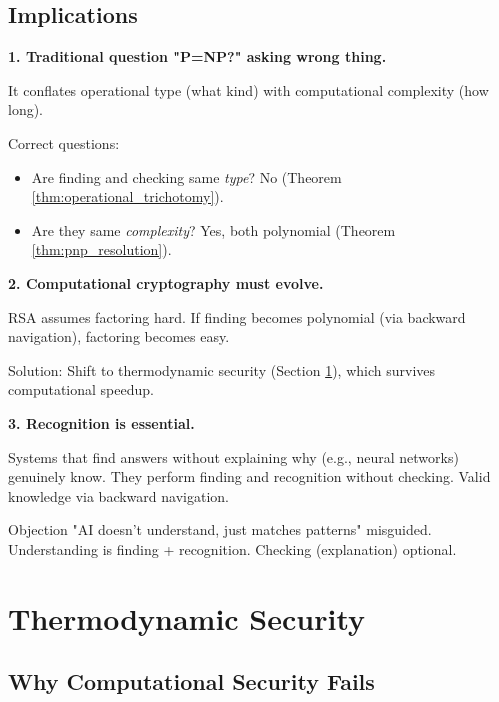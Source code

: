 \documentclass[twocolumn,10pt]{revtex4-2}
\theoremstyle{definition}
\theoremstyle{remark}
\begin{document}
\subsection{Implications}

\textbf{1. Traditional question "P=NP?" asking wrong thing.}

It conflates operational type (what kind) with computational complexity (how long).

Correct questions:
\begin{itemize}
\item Are finding and checking same \textit{type}? No (Theorem \ref{thm:operational_trichotomy}).
\item Are they same \textit{complexity}? Yes, both polynomial (Theorem \ref{thm:pnp_resolution}).
\end{itemize}

\vspace{0.2cm}
\noindent\textbf{2. Computational cryptography must evolve.}

RSA assumes factoring hard. If finding becomes polynomial (via backward navigation), factoring becomes easy.

Solution: Shift to thermodynamic security (Section \ref{sec:thermodynamic_security}), which survives computational speedup.

\vspace{0.2cm}
\noindent\textbf{3. Recognition is essential.}

Systems that find answers without explaining why (e.g., neural networks) genuinely know. They perform finding and recognition without checking. Valid knowledge via backward navigation.

Objection "AI doesn't understand, just matches patterns" misguided. Understanding is finding + recognition. Checking (explanation) optional.

\section{Thermodynamic Security}
\label{sec:thermodynamic_security}

\subsection{Why Computational Security Fails}
\end{document}
